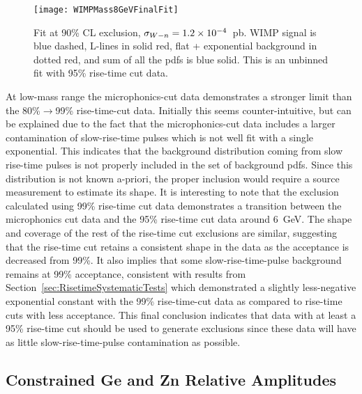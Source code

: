 			\begin{figure}
				\centering
				\texttt{[image: WIMPMass8GeVFinalFit]}
				\caption[Signal exclusion fit at 90\% CL.]
				{Fit at 90\% CL exclusion, $\sigma_{W-n} = 1.2 \times 10^{-4}$~pb.  
				WIMP signal is blue dashed, L-lines in solid red, flat + exponential background in dotted red, and 
				sum of all the pdfs is blue solid.
				This is an unbinned fit with 95\% rise-time cut data.  }
				\label{fig:WIMPFitExampleSigLikeBgd}
			\end{figure}

At low-mass range the microphonics-cut data demonstrates a stronger limit than the 80\%$\to$99\% rise-time-cut data.  Initially this seems counter-intuitive, but can be explained due to the fact that the microphonics-cut data includes a larger contamination of slow-rise-time pulses which is not well fit with a single exponential.  This indicates that the background distribution coming from slow rise-time pulses is not properly included in the set of background pdfs.  Since this distribution is not known a-priori, the proper inclusion would require a source measurement to estimate its shape.  It is interesting to note that the exclusion calculated using 99\% rise-time cut data demonstrates a transition between the microphonics cut data and the 95\% rise-time cut data around 6~GeV.  The shape and coverage of the rest of the rise-time cut exclusions are similar, suggesting that the rise-time cut retains a consistent shape in the data as the acceptance is decreased from 99\%.  It also implies that some slow-rise-time-pulse background remains at 99\% acceptance, consistent with results from Section~\ref{sec:RisetimeSystematicTests} which demonstrated a slightly less-negative exponential constant with the 99\% rise-time-cut data as compared to rise-time cuts with less acceptance.  This final conclusion indicates that data with at least a 95\% rise-time cut should be used to generate exclusions since these data will have as little slow-rise-time-pulse contamination as possible.  

		\subsection{Constrained Ge and Zn Relative Amplitudes}
		\label{sec:LimitsConstrained}
	
